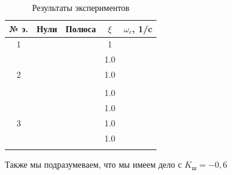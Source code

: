\begin{table}[H]
    \caption{Результаты экспериментов}
    \centering
    \label{tab:Результаты экспериментов без PI2}
    \begin{tabular}{|c|c|c|c|c|}
        \hline 
        № э.&Нули & Полюса & $\xi$ & $\omega_c$, 1/c \\ \hline 
        1& & & 1 &\\ \hline
        & & & 1.0 & \\ 
        2& & & 1.0 & \\ 
        & &  & &\\ 
        & &   &  1.0 &\\ \hline 
        & & & 1.0 &\\ 
        3& & & 1.0 &\\ 
        & & & 1.0 & \\ 
        & &  &  &\\ \hline
    \end{tabular}
\end{table}



    Также мы подразумеваем, что мы имеем дело с $K_\text{ш} = -0,6$
